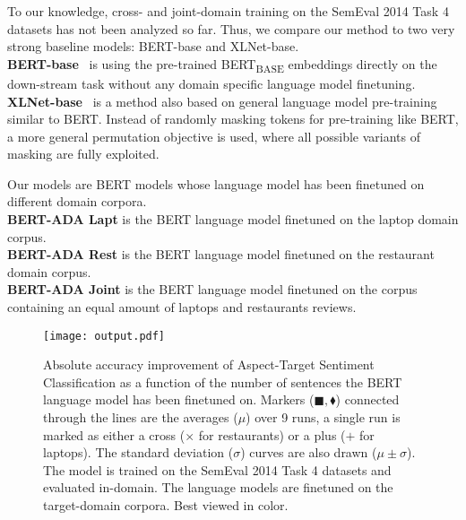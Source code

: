 \documentclass[11pt,a4paper]{article}
\begin{document}
To our knowledge, cross- and joint-domain training on the SemEval 2014 Task 4 datasets has not been analyzed so far. 
Thus, we compare our method to two very strong baseline models: BERT-base and XLNet-base. \\
\textbf{BERT-base}~\cite{Devlin2019}
is using the pre-trained BERT\textsubscript{BASE} embeddings directly on the down-stream task
without any domain specific language model finetuning. \\
\textbf{XLNet-base}~\cite{ArxYang2019}
is a method also based on general language model pre-training similar to BERT. Instead of randomly masking tokens for pre-training like BERT, a more general permutation objective is used, where all possible variants of masking are fully exploited.

Our models are BERT models whose language model has been finetuned on different domain corpora. \\
\textbf{BERT-ADA Lapt}
is the BERT language model finetuned on the laptop domain corpus. \\
\textbf{BERT-ADA Rest} 
is the BERT language model finetuned on the restaurant domain corpus. \\
\textbf{BERT-ADA Joint}
is the BERT language model finetuned on the corpus containing an equal amount of laptops and restaurants reviews.

\begin{figure}[t!]
  \texttt{[image: output.pdf]}
  \caption{Absolute accuracy improvement of Aspect-Target Sentiment Classification as a function of the number of sentences the BERT language model has been finetuned on. Markers ($\blacksquare, \blacklozenge$) connected through the lines are the averages ($\mu$) over 9 runs, a single run is marked as either a cross ($\times$ for restaurants) or a plus ($+$ for laptops). The standard deviation ($\sigma$) curves are also drawn ($\mu \pm \sigma$).
    The model is trained on the SemEval 2014 Task 4 datasets and evaluated in-domain. The language models are finetuned on the target-domain corpora. Best viewed in color.} \label{fig:acc-dep-lmiterations}
\end{figure} 
\end{document}
